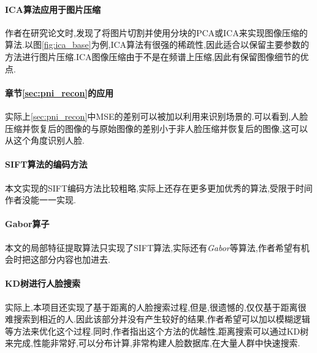 \paragraph{ICA算法应用于图片压缩}
作者在研究论文时,发现了将图片切割并使用分块的PCA或ICA来实现图像压缩的算法.以图\ref{fig:ica_base}为例,ICA算法有很强的稀疏性,因此适合以保留主要参数的方法进行图片压缩.ICA图像压缩由于不是在频谱上压缩,因此有保留图像细节的优点.

\paragraph{章节\ref{sec:pni_recon}的应用}
实际上\ref{sec:pni_recon}中MSE的差别可以被加以利用来识别场景的.可以看到,人脸压缩并恢复后的图像的与原始图像的差别小于非人脸压缩并恢复后的图像,这可以从这个角度识别人脸.

\paragraph{SIFT算法的编码方法}
本文实现的SIFT编码方法比较粗略,实际上还存在更多更加优秀的算法,受限于时间作者没能一一实现.

\paragraph{Gabor算子}
本文的局部特征提取算法只实现了SIFT算法,实际还有\textit{Gabor}等算法,作者希望有机会时把这部分内容也加进去.

\paragraph{KD树进行人脸搜索}
实际上,本项目还实现了基于距离的人脸搜索过程,但是,很遗憾的,仅仅基于距离很难搜索到相近的人.因此该部分并没有产生较好的结果,作者希望可以加以模糊逻辑等方法来优化这个过程.同时,作者指出这个方法的优越性,距离搜索可以通过KD树来完成,性能非常好,可以分布计算,非常构建人脸数据库,在大量人群中快速搜索.
